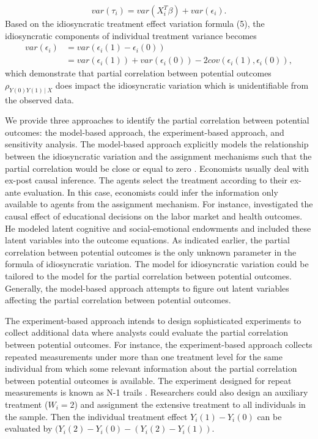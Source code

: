 	\begin{equation}
		var(\tau_{i}) = var(X_{i}^{T}\beta) + var(\epsilon_{i}). 
	\end{equation}
	Based on the idiosyncratic treatment effect variation formula (5), the idiosyncratic components of individual treatment variance becomes
	\begin{equation}
		\begin{array}{cl}
			var(\epsilon_{i}) &= var(\epsilon_{i}(1) -\epsilon_{i}(0))\\ 
			&= var(\epsilon_{i}(1)) + var(\epsilon_{i}(0)) - 2cov(\epsilon_{i}(1), \epsilon_{i}(0)), 
		\end{array}
	\end{equation} 
	which demonstrate that partial correlation between potential outcomes $\rho_{Y(0)Y(1)\,|\ X}$ does impact the idiosyncratic variation which is unidentifiable from the observed data. 
	
	We provide three approaches to identify the partial correlation between potential outcomes: the model-based approach, the experiment-based approach, and sensitivity analysis. The model-based approach explicitly models the relationship between the idiosyncratic variation and the assignment mechanisms such that the partial correlation would be close or equal to zero \citep{heckman2005scientific}. Economists usually deal with ex-post causal inference. The agents select the treatment according to their ex-ante evaluation. In this case, economists could infer the information only available to agents from the assignment mechanism.  For instance, \citet{heckman2010effects} investigated the causal effect of educational decisions on the labor market and health outcomes. He modeled latent cognitive and social-emotional endowments and included these latent variables into the outcome equations. As indicated earlier, the partial correlation between potential outcomes is the only unknown parameter in the formula of idiosyncratic variation. The model for idiosyncratic variation could be tailored to the model for the partial correlation between potential outcomes. Generally, the model-based approach attempts to figure out latent variables affecting the partial correlation between potential outcomes. 
	
	The experiment-based approach intends to design sophisticated experiments to collect additional data where analysts could evaluate the partial correlation between potential outcomes. For instance, the experiment-based approach collects repeated measurements under more than one treatment level for the same individual from which some relevant information about the partial correlation between potential outcomes is available. The experiment designed for repeat measurements is known as N-1 trails \citep{shamseer2015consort, araujo2016understanding}. Researchers could also design an auxiliary treatment ($W_{i} = 2$) and assignment the extensive treatment to all individuals in the sample. Then the individual treatment effect $Y_{i}(1) - Y_{i}(0)$ can be evaluated by $(Y_{i}(2) - Y_{i}(0) - (Y_{i}(2) - Y_{i}(1))$. 
	
